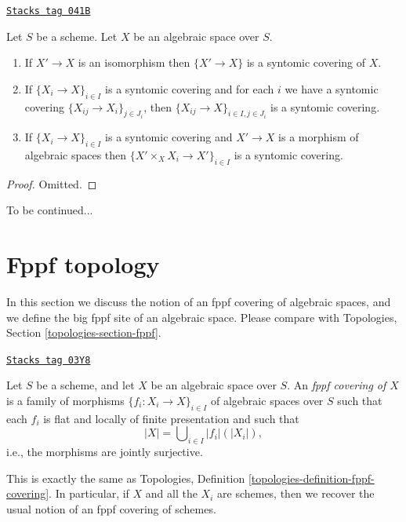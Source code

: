 \begin{lemma}[Syntomic]
\label{spaces-topologies-lemma-syntomic}
\href{https://stacks.math.columbia.edu/tag/041B}{\texttt{Stacks tag 041B}}

Let $S$ be a scheme.
Let $X$ be an algebraic space over $S$.
\begin{enumerate}
\item If $X' \to X$ is an isomorphism then $\{X' \to X\}$
is a syntomic covering of $X$.
\item If $\{X_i \to X\}_{i\in I}$ is a syntomic covering and for each
$i$ we have a syntomic covering $\{X_{ij} \to X_i\}_{j\in J_i}$, then
$\{X_{ij} \to X\}_{i \in I, j\in J_i}$ is a syntomic covering.
\item If $\{X_i \to X\}_{i\in I}$ is a syntomic covering
and $X' \to X$ is a morphism of algebraic spaces then
$\{X' \times_X X_i \to X'\}_{i\in I}$ is a syntomic covering.
\end{enumerate}
\end{lemma}

\begin{proof}
Omitted.
\end{proof}

To be continued...

\section{Fppf topology}
\label{spaces-topologies-section-fppf}
In this section we discuss the notion of an fppf covering of algebraic spaces,
and we define the big fppf site of an algebraic space. Please compare with
Topologies, Section \ref{topologies-section-fppf}.

\begin{definition}
\label{spaces-topologies-definition-fppf-covering}
\href{https://stacks.math.columbia.edu/tag/03Y8}{\texttt{Stacks tag 03Y8}}

Let $S$ be a scheme, and let $X$ be an algebraic space over $S$.
An {\it fppf covering of $X$} is a family of morphisms
$\{f_i : X_i \to X\}_{i \in I}$ of algebraic spaces over $S$
such that each $f_i$ is flat and locally of finite presentation
and such that
$$
|X| = \bigcup\nolimits_{i \in I} |f_i|(|X_i|),
$$
i.e., the morphisms are jointly surjective.
\end{definition}

This is exactly the same as
Topologies, Definition \ref{topologies-definition-fppf-covering}.
In particular, if $X$ and all the $X_i$ are schemes, then we recover the usual
notion of an fppf covering of schemes.

